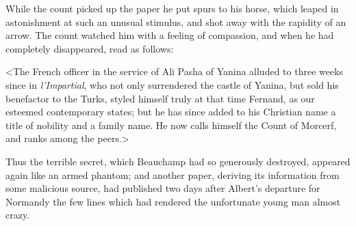  While the count picked up the paper he put spurs to his horse, which leaped in astonishment at such an unusual stimulus, and shot away with the rapidity of an arrow. The count watched him with a feeling of compassion, and when he had completely disappeared, read as follows: 

 <The French officer in the service of Ali Pasha of Yanina alluded to three weeks since in \textit{l'Impartial}, who not only surrendered the castle of Yanina, but sold his benefactor to the Turks, styled himself truly at that time Fernand, as our esteemed contemporary states; but he has since added to his Christian name a title of nobility and a family name. He now calls himself the Count of Morcerf, and ranks among the peers.> 

 Thus the terrible secret, which Beauchamp had so generously destroyed, appeared again like an armed phantom; and another paper, deriving its information from some malicious source, had published two days after Albert's departure for Normandy the few lines which had rendered the unfortunate young man almost crazy. 